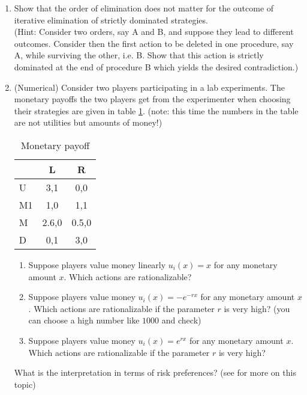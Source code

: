 \documentclass[a4paper,12pt]{article}
\begin{document}
\begin{enumerate}
\item Show that the order of elimination does not matter for the outcome of iterative elimination of strictly dominated strategies. \\(Hint: Consider two orders, say A and B, and suppose they lead to different outcomes. Consider then the first action to be deleted in one procedure, say A, while surviving the other, i.e. B. Show that this action is strictly dominated at the end of procedure B which yields the desired contradiction.)
\item (Numerical) Consider two players participating in a lab experiments. The monetary payoffs the two players get from the experimenter when choosing their strategies are given in table \ref{tab:monRatio}. (note: this time the numbers in the table are not utilities but amounts of money!)
  \begin{table}[h]
    \centering
    \begin{tabular}{l|c|c}
      & L &R\\ \hline
      U& 3,1  &0,0  \\
      M1&1,0&1,1 \\
      M&2.6,0  &0.5,0 \\
      D& 0,1 & 3,0
    \end{tabular}
    \caption{Monetary payoff}
    \label{tab:monRatio}
  \end{table}
  \begin{enumerate}
  \item Suppose players value money linearly $u_i(x)=x$ for any monetary amount $x$. Which actions are rationalizable?
  \item Suppose players value money  $u_i(x)=-e^{-r x}$ for any monetary amount $x$. Which actions are rationalizable if the parameter $r$ is very high? (you can choose a high number like $1000$ and check)
     \item Suppose players value money $u_i(x)=e^{r x}$ for any monetary amount $x$. Which actions are rationalizable if the parameter $r$ is very high?
     \end{enumerate}
     What is the interpretation in terms of risk preferences? (see \cite{weinstein2016effect} for more on this topic)
\end{enumerate}




\end{document}
